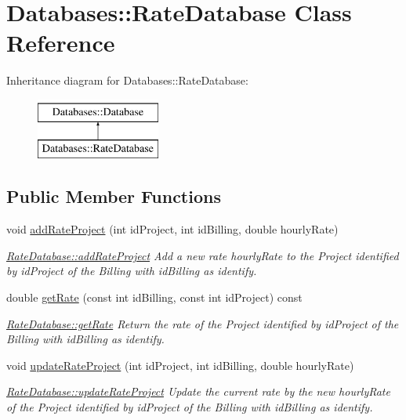 \hypertarget{classDatabases_1_1RateDatabase}{\section{Databases\-:\-:Rate\-Database Class Reference}
\label{classDatabases_1_1RateDatabase}
}
Inheritance diagram for Databases\-:\-:Rate\-Database\-:\begin{figure}[H]
\begin{center}
\leavevmode
\includegraphics[height=2.000000cm]{d9/d21/classDatabases_1_1RateDatabase}
\end{center}
\end{figure}
\subsection*{Public Member Functions}
\begin{DoxyCompactItemize}
\item 
void \hyperlink{classDatabases_1_1RateDatabase_aee32610b164a56b9aaa0a3acddfd8c27}{add\-Rate\-Project} (int id\-Project, int id\-Billing, double hourly\-Rate)
\begin{DoxyCompactList}\small\item\em \hyperlink{classDatabases_1_1RateDatabase_aee32610b164a56b9aaa0a3acddfd8c27}{Rate\-Database\-::add\-Rate\-Project} Add a new rate {\itshape hourly\-Rate} to the Project identified by {\itshape id\-Project} of the Billing with {\itshape id\-Billing} as identify. \end{DoxyCompactList}\item 
double \hyperlink{classDatabases_1_1RateDatabase_a2d3e0e20c108d335903b17d291fe1a13}{get\-Rate} (const int id\-Billing, const int id\-Project) const 
\begin{DoxyCompactList}\small\item\em \hyperlink{classDatabases_1_1RateDatabase_a2d3e0e20c108d335903b17d291fe1a13}{Rate\-Database\-::get\-Rate} Return the rate of the Project identified by {\itshape id\-Project} of the Billing with {\itshape id\-Billing} as identify. \end{DoxyCompactList}\item 
void \hyperlink{classDatabases_1_1RateDatabase_a48019f4138b2a3bc3cbd144b1dec6abc}{update\-Rate\-Project} (int id\-Project, int id\-Billing, double hourly\-Rate)
\begin{DoxyCompactList}\small\item\em \hyperlink{classDatabases_1_1RateDatabase_a48019f4138b2a3bc3cbd144b1dec6abc}{Rate\-Database\-::update\-Rate\-Project} Update the current rate by the new {\itshape hourly\-Rate} of the Project identified by {\itshape id\-Project} of the Billing with {\itshape id\-Billing} as identify. \end{DoxyCompactList}\end{DoxyCompactItemize}
